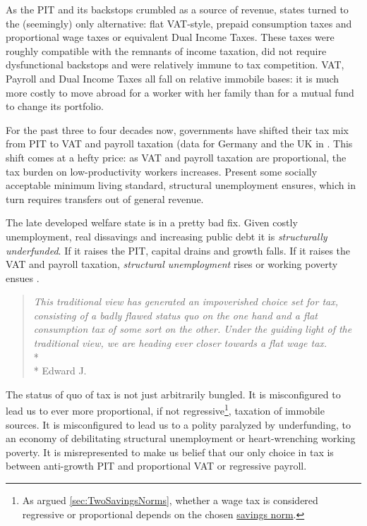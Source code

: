 As the PIT and its backstops crumbled as a source of revenue, states turned to the (seemingly) only alternative:
flat VAT-style, prepaid consumption taxes and proportional wage taxes or equivalent Dual Income Taxes.
These taxes were roughly compatible with the remnants of income taxation, did not require dysfunctional backstops and were relatively immune to tax competition.
VAT, Payroll and Dual Income Taxes all fall on relative immobile bases:
it is much more costly to move abroad for a worker with her family than for a mutual fund to change its portfolio.

For the past three to four decades now, governments have shifted their tax mix from PIT to VAT and payroll taxation (data for Germany and the UK in \citealt[11]{Kemmerling2009}.
This shift comes at a hefty price:
as VAT and payroll taxation are proportional, the tax burden on low-productivity workers increases.
Present some socially acceptable minimum living standard, structural unemployment ensures, which in turn requires transfers out of general revenue.

The late developed welfare state is in a pretty bad fix.
Given costly unemployment, real dissavings and increasing public debt it is \emph{structurally underfunded}.
If it raises the PIT, capital drains and growth falls.
If it raises the VAT and payroll taxation, \emph{structural unemployment} rises or working poverty ensues \citep{Kato2003}.

\begin{quote}
	\emph{This traditional view has generated an impoverished choice set for tax, consisting of a badly flawed status quo on the one hand and a flat consumption tax of some sort on the other.
Under the guiding light of the traditional view, we are heading ever closer towards a flat wage tax.}\\*\\*
	Edward J.\ \cite[812]{McCaffery2005}
\end{quote}

The status of quo of tax is not just arbitrarily bungled.
It is misconfigured to lead us to ever more proportional, if not regressive\footnote{As argued \autoref{sec:TwoSavingsNorms}, whether a wage tax is considered regressive or proportional depends on the chosen \hyperref[sec:TwoSavingsNorms]{savings norm}.}, taxation of immobile sources.
It is misconfigured to lead us to a polity paralyzed by underfunding, to an economy of debilitating structural unemployment or heart-wrenching working poverty.
It is misrepresented to make us belief that our only choice in tax is between anti-growth PIT and proportional VAT or regressive payroll.

